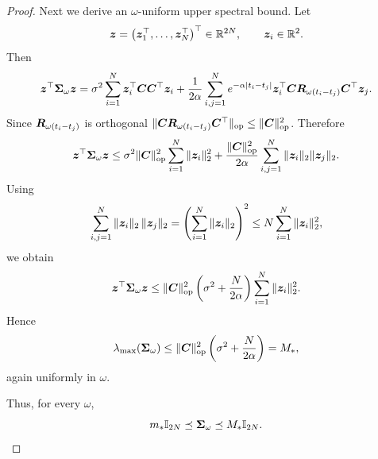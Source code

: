 \begin{proof}
Next we derive an $\omega$-uniform upper spectral bound. 
Let
\begin{equation*}
    \boldsymbol{z}
    =
    \big(
        \boldsymbol{z}_1^\top,
        \ldots,
        \boldsymbol{z}_N^\top
    \big)^\top
    \in \mathbb{R}^{2N},
    \qquad
    \boldsymbol{z}_i \in \mathbb{R}^2.
\end{equation*}
Then
\begin{equation*}
    \boldsymbol{z}^\top \boldsymbol{\Sigma}_\omega \boldsymbol{z}
    =
    \sigma^2
    \sum_{i=1}^N
    \boldsymbol{z}_i^\top \boldsymbol{C}\boldsymbol{C}^\top \boldsymbol{z}_i +
    \frac{1}{2\alpha}
    \sum_{i,j=1}^N
    e^{-\alpha |t_i-t_j|}
    \boldsymbol{z}_i^\top
    \boldsymbol{C} \boldsymbol{R}_{\omega(t_i-t_j)} \boldsymbol{C}^\top
    \boldsymbol{z}_j.
\end{equation*}
Since $\boldsymbol{R}_{\omega(t_i-t_j)}$ is orthogonal $\|\boldsymbol{C} \boldsymbol{R}_{\omega(t_i-t_j)} \boldsymbol{C}^\top \|_{\mathrm{op}} \leq \|\boldsymbol{C}\|_{\mathrm{op}}^2$.
Therefore
\begin{equation*}
    \boldsymbol{z}^\top \boldsymbol{\Sigma}_\omega \boldsymbol{z}
    \leq 
    \sigma^2 \|\boldsymbol{C}\|_{\mathrm{op}}^2
    \sum_{i=1}^N \|\boldsymbol{z}_i\|_2^2  +
    \frac{\|\boldsymbol{C}\|_{\mathrm{op}}^2}{2\alpha}
    \sum_{i,j=1}^N
    \|\boldsymbol{z}_i\|_2 \|\boldsymbol{z}_j\|_2.
\end{equation*}
Using
\begin{equation*}
    \sum_{i,j=1}^N
    \|\boldsymbol{z}_i\|_2 \, \|\boldsymbol{z}_j\|_2
    =
    \left(
        \sum_{i=1}^N \|\boldsymbol{z}_i\|_2
    \right)^2
    \leq
    N \sum_{i=1}^N \|\boldsymbol{z}_i\|_2^2,
\end{equation*}
we obtain
\begin{equation*}
    \boldsymbol{z}^\top \boldsymbol{\Sigma}_\omega \boldsymbol{z}
    \leq
    \|\boldsymbol{C}\|_{\mathrm{op}}^2
    \left(
        \sigma^2 + \frac{N}{2\alpha}
    \right)
    \sum_{i=1}^N \|\boldsymbol{z}_i\|_2^2.
\end{equation*}
Hence
\begin{equation*}
    \lambda_{\max}(\boldsymbol{\Sigma}_\omega)
    \leq
    \|\boldsymbol{C}\|_{\mathrm{op}}^2
    \left(
        \sigma^2 + \frac{N}{2\alpha}
    \right)
    =
    M_*,
\end{equation*}
again uniformly in $\omega$.

Thus, for every $\omega$,
\begin{equation*}
    m_* \mathbb{I}_{2N}
    \preceq
    \boldsymbol{\Sigma}_\omega
    \preceq
    M_* \mathbb{I}_{2N}.
\end{equation*}


\end{proof}
